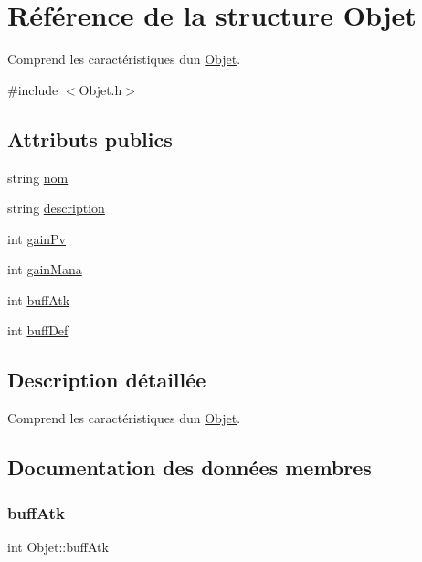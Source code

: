 \hypertarget{structObjet}{}\section{Référence de la structure Objet}
\label{structObjet}


Comprend les caractéristiques d\textquotesingle{}un \mbox{\hyperlink{structObjet}{Objet}}.  




{\ttfamily \#include $<$Objet.\+h$>$}

\subsection*{Attributs publics}
\begin{DoxyCompactItemize}
\item 
string \mbox{\hyperlink{structObjet_a9e83b65144a3f7121a5042c70a5e41db}{nom}}
\item 
string \mbox{\hyperlink{structObjet_a859a7cc06454b94c97137f972f558f2d}{description}}
\item 
int \mbox{\hyperlink{structObjet_a90b37eae967b944035f8572e08f10a07}{gain\+Pv}}
\item 
int \mbox{\hyperlink{structObjet_addb6bc5586e8d753634d6af2996555ae}{gain\+Mana}}
\item 
int \mbox{\hyperlink{structObjet_aefb377d41c63ea2b8ec85432ed84bbef}{buff\+Atk}}
\item 
int \mbox{\hyperlink{structObjet_a42d2bd62696101046a02f87eeacb47c6}{buff\+Def}}
\end{DoxyCompactItemize}


\subsection{Description détaillée}
Comprend les caractéristiques d\textquotesingle{}un \mbox{\hyperlink{structObjet}{Objet}}. 

\subsection{Documentation des données membres}
\mbox{\label{structObjet_aefb377d41c63ea2b8ec85432ed84bbef}} 
\subsubsection{\texorpdfstring{buff\+Atk}{buffAtk}}
{\footnotesize\ttfamily int Objet\+::buff\+Atk}

